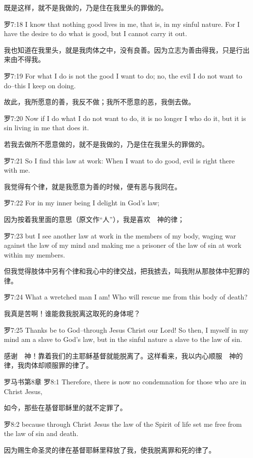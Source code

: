 \documentclass[a4paper,11pt,onecolumn,twoside]{ctexart}
\begin{document}
\begin{multicols}{2}
 既是这样，就不是我做的，乃是住在我里头的罪做的。


 罗7:18
 I know that nothing good lives in me, that is, in my sinful nature. For I have the desire to do what is good, but I cannot carry it out.

 我也知道在我里头，就是我肉体之中，没有良善。因为立志为善由得我，只是行出来由不得我。


 罗7:19
 For what I do is not the good I want to do; no, the evil I do not want to do--this I keep on doing.

 故此，我所愿意的善，我反不做；我所不愿意的恶，我倒去做。


 罗7:20
 Now if I do what I do not want to do, it is no longer I who do it, but it is sin living in me that does it.

 若我去做所不愿意做的，就不是我做的，乃是住在我里头的罪做的。


 罗7:21
 So I find this law at work: When I want to do good, evil is right there with me.

 我觉得有个律，就是我愿意为善的时候，便有恶与我同在。


 罗7:22
 For in my inner being I delight in God's law;

 因为按着我里面的意思（原文作“人”），我是喜欢　神的律；


 罗7:23
 but I see another law at work in the members of my body, waging war against the law of my mind and making me a prisoner of the law of sin at work within my members.

 但我觉得肢体中另有个律和我心中的律交战，把我掳去，叫我附从那肢体中犯罪的律。


 罗7:24
 What a wretched man I am! Who will rescue me from this body of death?

 我真是苦啊！谁能救我脱离这取死的身体呢？


 罗7:25
 Thanks be to God--through Jesus Christ our Lord! So then, I myself in my mind am a slave to God's law, but in the sinful nature a slave to the law of sin.

 感谢　神！靠着我们的主耶稣基督就能脱离了。这样看来，我以内心顺服　神的律，我肉体却顺服罪的律了。


 罗马书第8章
 罗8:1
 Therefore, there is now no condemnation for those who are in Christ Jesus,

 如今，那些在基督耶稣里的就不定罪了。


 罗8:2
 because through Christ Jesus the law of the Spirit of life set me free from the law of sin and death.

 因为赐生命圣灵的律在基督耶稣里释放了我，使我脱离罪和死的律了。



\end{multicols}
\end{document}
